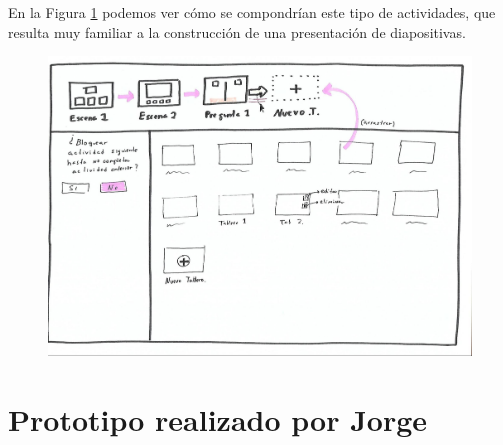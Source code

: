 En la Figura \ref{fig:presentaciontableros} podemos ver cómo se compondrían este tipo de actividades, que resulta muy familiar a la construcción de una presentación de diapositivas.  

\begin{figure}[h!]
	\centering
	\includegraphics[width=0.7\linewidth]{Imagenes/Bitmap/presentacionTableros}
	\caption{}
	\label{fig:presentaciontableros}
\end{figure}


\section*{Prototipo realizado por Jorge}

